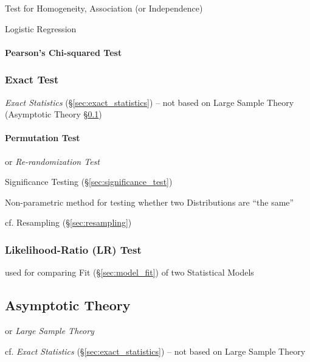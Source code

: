 Test for Homogeneity, Association (or Independence)

Logistic Regression



\paragraph{Pearson's Chi-squared Test}\label{sec:pearsons_chi_squared}\hfill



\subsubsection{Exact Test}\label{sec:exact_test}

\emph{Exact Statistics} (\S\ref{sec:exact_statistics}) -- not based on Large
Sample Theory (Asymptotic Theory \S\ref{sec:asymptotic_theory})



\paragraph{Permutation Test}\label{sec:permutation_test}\hfill

or \emph{Re-randomization Test}

Significance Testing (\S\ref{sec:significance_test})

Non-parametric method for testing whether two Distributions are ``the same''

\fist cf. Resampling (\S\ref{sec:resampling})



\subsubsection{Likelihood-Ratio (LR) Test}\label{sec:lr_test}

used for comparing Fit (\S\ref{sec:model_fit}) of two Statistical Models



\subsection{Asymptotic Theory}\label{sec:asymptotic_theory}

or \emph{Large Sample Theory}

\fist cf. \emph{Exact Statistics} (\S\ref{sec:exact_statistics}) -- not based on
Large Sample Theory

